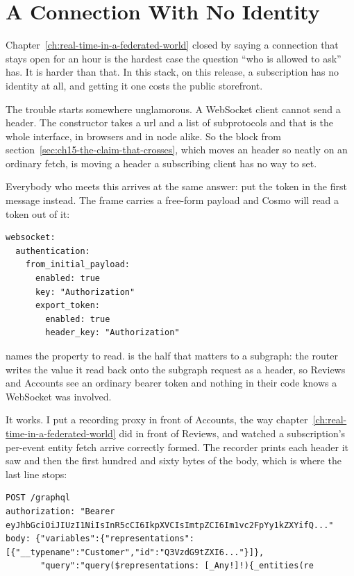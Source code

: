 \section{A Connection With No Identity}
\label{sec:ch15-a-connection-with-no-identity}
%

Chapter~\ref{ch:real-time-in-a-federated-world} closed by saying a connection
that stays open for an hour is the hardest case the question \enquote{who is
allowed to ask} has. It is harder than that. In this stack, on this release, a
subscription has no identity at all, and getting it one costs the public
storefront.

The trouble starts somewhere unglamorous. A WebSocket client cannot send a
header. The constructor takes a url and a list of subprotocols and that is the
whole interface, in browsers and in node alike. So the  block from
section~\ref{sec:ch15-the-claim-that-crosses}, which moves an
 header so neatly on an ordinary fetch, is moving a header a
subscribing client has no way to set.

%
Everybody who meets this arrives at the same answer: put the token in the first
message instead. The  frame carries a free-form payload
and Cosmo will read a token out of it:

\begin{verbatim}
websocket:
  authentication:
    from_initial_payload:
      enabled: true
      key: "Authorization"
      export_token:
        enabled: true
        header_key: "Authorization"
\end{verbatim}

 names the property to read.  is the half that
matters to a subgraph: the router writes the value it read back onto the
subgraph request as a header, so Reviews and Accounts see an ordinary bearer
token and nothing in their code knows a WebSocket was involved.

It works. I put a recording proxy in front of Accounts, the way
chapter~\ref{ch:real-time-in-a-federated-world} did in front of Reviews, and
watched a subscription's per-event entity fetch arrive correctly formed. The
recorder prints each header it saw and then the first hundred and sixty bytes of
the body, which is where the last line stops:

\begin{verbatim}
POST /graphql
authorization: "Bearer eyJhbGciOiJIUzI1NiIsInR5cCI6IkpXVCIsImtpZCI6Im1vc2FpYy1kZXYifQ..."
body: {"variables":{"representations":[{"__typename":"Customer","id":"Q3VzdG9tZXI6..."}]},
       "query":"query($representations: [_Any!]!){_entities(re
\end{verbatim}

